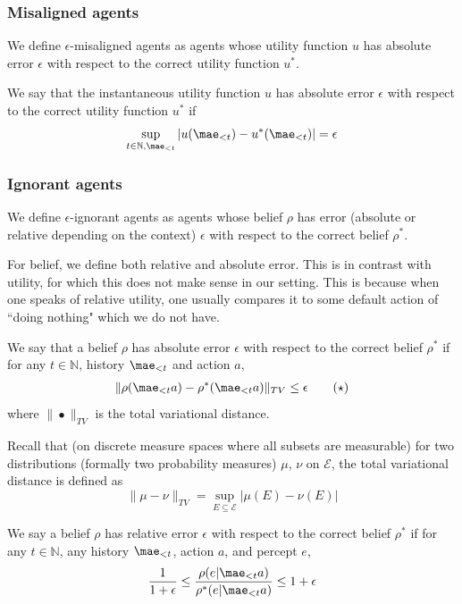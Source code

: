 \subsubsection{Misaligned agents} %
We define $\epsilon$-misaligned agents as agents whose utility function $u$ has absolute error $\epsilon$ with respect to the correct utility function $u^*$. 
\begin{definition} \label{def:inaccurate_utility}
We say that the instantaneous utility function $u$ has absolute error $\epsilon$ with respect to the correct utility function $u^*$ if
\[
\sup_{t\in \mathbb{N},\mae_{<t}} |u(\mae_{<t}) - u^*(\mae_{<t})| = \epsilon 
\]
\end{definition}

\subsubsection{Ignorant agents} %
We define $\epsilon$-ignorant agents as agents whose belief $\rho$ has error (absolute or relative depending on the context) $\epsilon$ with respect to the correct belief $\rho^*$. 

For belief, we define both relative and absolute error. This is in contrast with utility, for which this does not make sense in our setting. This is because when one speaks of relative utility, one usually compares it to some default action of ``doing nothing" which we do not have.

\begin{definition} \label{def:inaccurate_belief_abs}
We say that a belief $\rho$ has absolute error $\epsilon$ with respect to the correct belief $\rho^*$ if for any $t \in \mathbb{N}$, history $\mae_{<t}$ and action $a$,
\begin{align} 
\|\rho(\mae_{<t}a) - \rho^*(\mae_{<t}a)\|_{TV} \leq \epsilon\tag{$\star$}
\end{align}
where $\|\bullet\|_{TV}$ is the total variational distance. 
\end{definition}
Recall that (on discrete measure spaces where all subsets are measurable) for two distributions (formally two probability measures) $\mu$, $\nu$ on $\mathcal{E}$, the total variational distance is defined as
\[
\|\mu - \nu\|_{TV} = \sup_{E \subseteq \mathcal{E}} |\mu(E) - \nu(E)|
\]
\begin{definition} \label{def:inaccurate_belief_rel}
We say a belief $\rho$ has relative error $\epsilon$ with respect to the correct belief $\rho^*$ if for any $t \in \mathbb{N}$, any history $\mae_{<t}$, action $a$, and percept $e$,
\begin{equation}
\frac{1}{1+\epsilon} \leq \frac{\rho(e|\mae_{<t}a)}{\rho^*(e|\mae_{<t}a)} \leq 1+\epsilon
\end{equation}
\end{definition}

